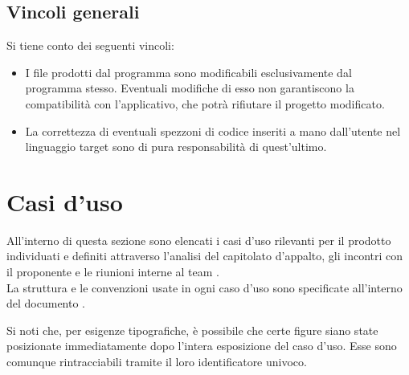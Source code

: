 \subsection{Vincoli generali}
    Si tiene conto dei seguenti vincoli:
    
    \begin{itemize}
    \item I file prodotti dal programma sono modificabili esclusivamente dal programma stesso. Eventuali modifiche di esso non garantiscono la compatibilità con l'applicativo, che potrà rifiutare il progetto modificato.
    \item La correttezza di eventuali spezzoni di codice inseriti a mano dall'utente nel linguaggio target sono di pura responsabilità di quest'ultimo.
    \end{itemize}	
	
	
\newpage

\section{Casi d'uso}
All'interno di questa sezione sono elencati i casi d'uso rilevanti per il prodotto \proj{} individuati e definiti attraverso l'analisi del capitolato d'appalto, gli incontri con il proponente e le riunioni interne al team \hx{}. 
\\La struttura e le convenzioni usate in ogni caso d'uso sono specificate all'interno del documento \NdP.

Si noti che, per esigenze tipografiche, è possibile che certe figure siano state posizionate immediatamente dopo l'intera esposizione del caso d'uso. Esse sono comunque rintracciabili tramite il loro identificatore univoco.

